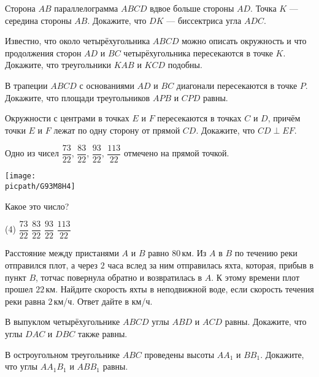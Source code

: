 \begin{consultation}
	\begin{listofex}
		\item Сторона \( AB \) параллелограмма \( ABCD \) вдвое больше стороны \( AD \). Точка \( K \) --- середина стороны \( AB \). Докажите, что \( DK \) --- биссектриса угла \( ADC \).
		\item Известно, что около четырёхугольника \( ABCD \) можно описать окружность и что продолжения сторон \( AD \) и \( BC \) четырёхугольника пересекаются в точке \( K \). Докажите, что треугольники \( KAB \) и \( KCD \) подобны.
		\item В трапеции \( ABCD \) с основаниями \( AD \) и \( BC \) диагонали пересекаются в точке \( P \). Докажите, что площади треугольников \( APB \) и \( CPD \) равны.
		\item Окружности с центрами в точках \( E \) и \( F \) пересекаются в точках \( C \) и \( D \), причём точки \( E \) и \( F \) лежат по одну сторону от  прямой \( CD \). Докажите, что \( CD\perp EF \).
	\end{listofex}
\end{consultation}

\begin{homework}[number=4]
	\begin{listofex}
		\item Одно из чисел \( \dfrac{73}{22} \), \( \dfrac{83}{22} \), \( \dfrac{93}{22} \), \( \dfrac{113}{22} \) отмечено на прямой точкой.
		\begin{center}
			\texttt{[image: \\picpath/G93M8H4]}
		\end{center}
		Какое это число?
		\begin{tasks}(4)
			\task \( \dfrac{73}{22} \)
			\task \( \dfrac{83}{22} \)
			\task \( \dfrac{93}{22} \)
			\task \( \dfrac{113}{22} \)
		\end{tasks}
		\item Расстояние между пристанями \( A \) и \( B \) равно \( 80 \) км. Из \( A \) в \( B \) по течению реки отправился плот, а через \( 2 \) часа вслед за ним отправилась яхта, которая, прибыв в пункт \( B \), тотчас повернула обратно и возвратилась в \( A \). К этому времени плот прошел \( 22 \) км. Найдите скорость яхты в неподвижной воде, если скорость течения реки равна \( 2 \) км/ч. Ответ дайте в км/ч.
		\item В выпуклом четырёхугольнике \( ABCD \) углы \( ABD \) и \( ACD \) равны. Докажите, что углы \( DAC \) и \( DBC \) также равны.
		\item В остроугольном треугольнике \( ABC \) проведены высоты \( AA_1 \) и \( BB_1 \). Докажите, что углы \( AA_1B_1 \) и \( ABB_1 \) равны.
	\end{listofex}
\end{homework}

